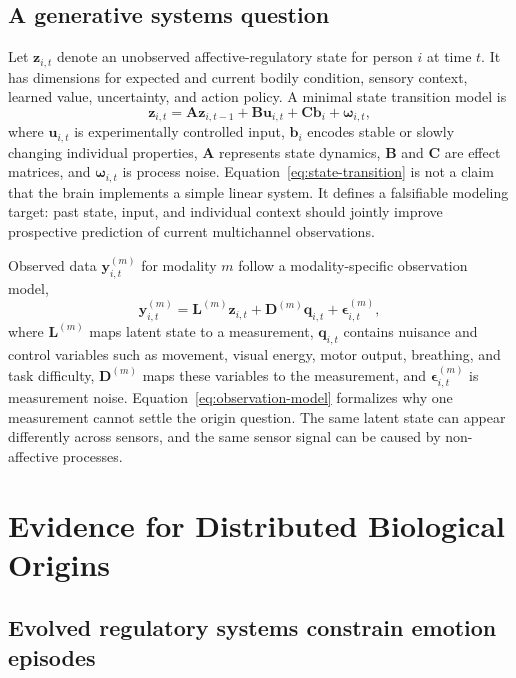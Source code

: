 \documentclass[conference]{IEEEtran}
\begin{document}
\subsection{A generative systems question}

Let $\mathbf{z}_{i,t}$ denote an unobserved affective-regulatory state for person $i$ at time $t$. It has dimensions for expected and current bodily condition, sensory context, learned value, uncertainty, and action policy. A minimal state transition model is
\begin{equation}
\mathbf{z}_{i,t}=\mathbf{A}\mathbf{z}_{i,t-1}+\mathbf{B}\mathbf{u}_{i,t}+\mathbf{C}\mathbf{b}_{i}+\boldsymbol{\omega}_{i,t},
\label{eq:state-transition}
\end{equation}
where $\mathbf{u}_{i,t}$ is experimentally controlled input, $\mathbf{b}_{i}$ encodes stable or slowly changing individual properties, $\mathbf{A}$ represents state dynamics, $\mathbf{B}$ and $\mathbf{C}$ are effect matrices, and $\boldsymbol{\omega}_{i,t}$ is process noise. Equation~\eqref{eq:state-transition} is not a claim that the brain implements a simple linear system. It defines a falsifiable modeling target: past state, input, and individual context should jointly improve prospective prediction of current multichannel observations.

Observed data $\mathbf{y}^{(m)}_{i,t}$ for modality $m$ follow a modality-specific observation model,
\begin{equation}
\mathbf{y}^{(m)}_{i,t}=\mathbf{L}^{(m)}\mathbf{z}_{i,t}+\mathbf{D}^{(m)}\mathbf{q}_{i,t}+\boldsymbol{\epsilon}^{(m)}_{i,t},
\label{eq:observation-model}
\end{equation}
where $\mathbf{L}^{(m)}$ maps latent state to a measurement, $\mathbf{q}_{i,t}$ contains nuisance and control variables such as movement, visual energy, motor output, breathing, and task difficulty, $\mathbf{D}^{(m)}$ maps these variables to the measurement, and $\boldsymbol{\epsilon}^{(m)}_{i,t}$ is measurement noise. Equation~\eqref{eq:observation-model} formalizes why one measurement cannot settle the origin question. The same latent state can appear differently across sensors, and the same sensor signal can be caused by non-affective processes.

\section{Evidence for Distributed Biological Origins}

\subsection{Evolved regulatory systems constrain emotion episodes}
\end{document}
